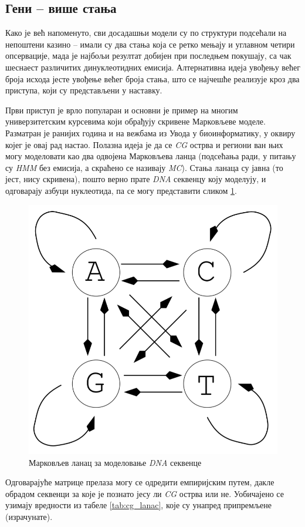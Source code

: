 \documentclass[12pt,oneside]{memoir}
\begin{document}
\begin{CJK}{UTF8}{ipxm}
\section{Гени -- више стања}
Како је већ напоменуто, сви досадашњи модели су по структури подсећали на непоштени казино -- имали су два стања која се ретко мењају и углавном четири опсервације, мада је најбољи резултат добијен при последњем покушају, са чак шеснаест различитих динуклеотидних емисија. Алтернативна идеја увођењу већег броја исхода јесте увођење већег броја стања, што се најчешће реализује кроз два приступа, који су представљени у наставку.

Први приступ је врло популаран и основни је пример на многим универзитетским курсевима који обрађују скривене Марковљеве моделе\cite{holmes2012, huson2020, kellis2021, shamir2009}. Разматран је ранијих година и на вежбама из Увода у биоинформатику, у оквиру којег је овај рад настао. Полазна идеја је да се \textit{CG} острва и региони ван њих могу моделовати као два одвојена Марковљева ланца (подсећања ради, у питању су \textit{HMM} без емисија, а скраћено се називају \textit{MC}). Стања ланаца су јавна (то јест, нису скривена), пошто верно прате \textit{DNA} секвенцу коју моделују, и одговарају азбуци нуклеотида, па се могу представити сликом \ref{fig:cg_lanac}.

\begin{figure}[H]
  \centering
  \includegraphics[width=.5\textwidth]{cg_lanac.png}
  \caption{Марковљев ланац за моделовање \textit{DNA} секвенце\cite{huson2020}}
  \label{fig:cg_lanac}
\end{figure}

Одговарајуће матрице прелаза могу се одредити емпиријским путем, дакле обрадом секвенци за које је познато јесу ли \textit{CG} острва или не. Уобичајено се узимају вредности из табеле \ref{tab:cg_lanac}, које су унапред припремљене (израчунате).


\end{CJK}
\end{document}
